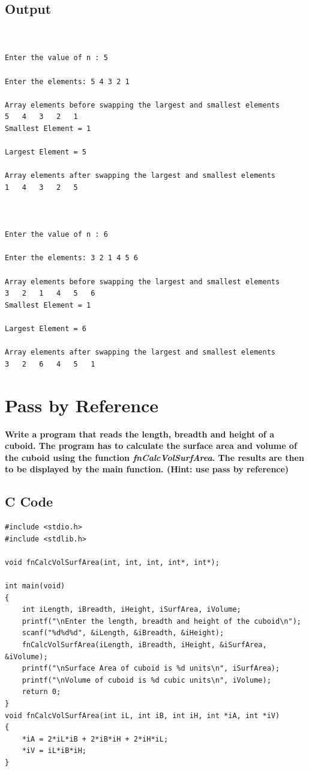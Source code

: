 \documentclass[a4paper]{report}
\begin{document}
\section*{Output}
\begin{Verbatim}


Enter the value of n : 5

Enter the elements: 5 4 3 2 1

Array elements before swapping the largest and smallest elements
5	4	3	2	1	
Smallest Element = 1

Largest Element = 5

Array elements after swapping the largest and smallest elements
1	4	3	2	5	



Enter the value of n : 6

Enter the elements: 3 2 1 4 5 6

Array elements before swapping the largest and smallest elements
3	2	1	4	5	6	
Smallest Element = 1

Largest Element = 6

Array elements after swapping the largest and smallest elements
3	2	6	4	5	1	

\end{Verbatim}

\chapter{Pass by Reference}
{\selectfont \textbf{Write a program that reads the length, breadth and height of a cuboid. The program has to calculate the surface area and volume of the cuboid using the function \textit{fnCalcVolSurfArea}. The results are then to be displayed by the main function. (Hint: use pass by reference) 
}}
\section*{C Code}
\begin{Verbatim}
#include <stdio.h>
#include <stdlib.h>

void fnCalcVolSurfArea(int, int, int, int*, int*);

int main(void)
{
    int iLength, iBreadth, iHeight, iSurfArea, iVolume;
    printf("\nEnter the length, breadth and height of the cuboid\n");
    scanf("%d%d%d", &iLength, &iBreadth, &iHeight);
    fnCalcVolSurfArea(iLength, iBreadth, iHeight, &iSurfArea, &iVolume);
    printf("\nSurface Area of cuboid is %d units\n", iSurfArea);
    printf("\nVolume of cuboid is %d cubic units\n", iVolume);
    return 0;
}
void fnCalcVolSurfArea(int iL, int iB, int iH, int *iA, int *iV)
{
    *iA = 2*iL*iB + 2*iB*iH + 2*iH*iL;
    *iV = iL*iB*iH;
}
\end{Verbatim}
\end{document}
